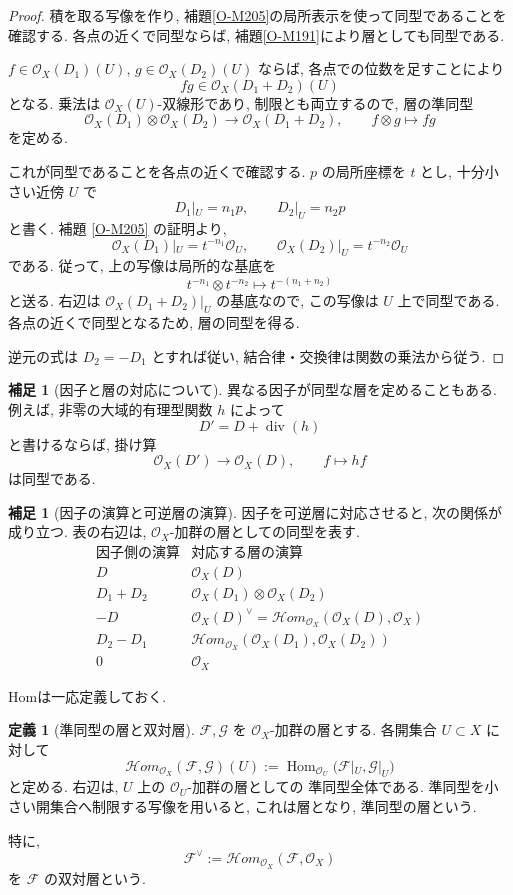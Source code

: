 \documentclass[dvipdfmx,a4paper,11pt]{article} %
\theoremstyle{definition}
\numberwithin{equation}{section}
\newtheorem{dfn}[thm]{定義}
\newtheorem{rem}[thm]{補足}
\begin{document}
\begin{proof}
積を取る写像を作り, 補題\ref{O-M205}の局所表示を使って同型であることを確認する. 各点の近くで同型ならば, 補題\ref{O-M191}により層としても同型である.

$f\in\mathcal O_X(D_1)(U)$, 
$g\in\mathcal O_X(D_2)(U)$ ならば, 
各点での位数を足すことにより
\[
fg\in\mathcal O_X(D_1+D_2)(U)
\]
となる.
乗法は $\mathcal O_X(U)$-双線形であり, 制限とも両立するので, 
層の準同型
\[
\mathcal O_X(D_1)\otimes\mathcal O_X(D_2)
\longrightarrow\mathcal O_X(D_1+D_2),
\qquad f\otimes g\longmapsto fg
\]
を定める.

これが同型であることを各点の近くで確認する.
$p$ の局所座標を $t$ とし, 十分小さい近傍 $U$ で
\[
D_1|_U=n_1p,\qquad D_2|_U=n_2p
\]
と書く.
補題 \ref{O-M205} の証明より, 
\[
\mathcal O_X(D_1)|_U=t^{-n_1}\mathcal O_U,\qquad
\mathcal O_X(D_2)|_U=t^{-n_2}\mathcal O_U
\]
である.
従って, 上の写像は局所的な基底を
\[
t^{-n_1}\otimes t^{-n_2}
\longmapsto t^{-(n_1+n_2)}
\]
と送る.
右辺は $\mathcal O_X(D_1+D_2)|_U$ の基底なので, 
この写像は $U$ 上で同型である.
各点の近くで同型となるため, 層の同型を得る.

逆元の式は $D_2=-D_1$ とすれば従い, 結合律・交換律は関数の乗法から従う.
\end{proof}

\begin{rem}[因子と層の対応について]
異なる因子が同型な層を定めることもある.
例えば, 非零の大域的有理型関数 $h$ によって
\[
D'=D+\operatorname{div}(h)
\]
と書けるならば, 掛け算
\[
\mathcal O_X(D')\longrightarrow\mathcal O_X(D),
\qquad f\longmapsto hf
\]
は同型である.
\end{rem}


\begin{rem}[因子の演算と可逆層の演算]
因子を可逆層に対応させると, 次の関係が成り立つ.
表の右辺は, $\mathcal O_X$-加群の層としての同型を表す.
\[
\begin{array}{c|c}
\text{因子側の演算} & \text{対応する層の演算}\\ \hline
D & \mathcal O_X(D)\\[2pt]
D_1+D_2
& \mathcal O_X(D_1)\otimes\mathcal O_X(D_2)\\[2pt]
-D
& \mathcal O_X(D)^\vee
 =\mathcal Hom_{\mathcal O_X}(\mathcal O_X(D),\mathcal O_X)\\[2pt]
D_2-D_1
& \mathcal Hom_{\mathcal O_X}
  (\mathcal O_X(D_1),\mathcal O_X(D_2))\\[2pt]
0 & \mathcal O_X
\end{array}
\]

Homは一応定義しておく. 
\begin{dfn}[準同型の層と双対層]
$\mathcal F,\mathcal G$ を $\mathcal O_X$-加群の層とする.
各開集合 $U\subset X$ に対して
\[
\mathcal Hom_{\mathcal O_X}(\mathcal F,\mathcal G)(U)
:=
\operatorname{Hom}_{\mathcal O_U}
\bigl(\mathcal F|_U,\mathcal G|_U\bigr)
\]
と定める.
右辺は, $U$ 上の $\mathcal O_U$-加群の層としての
準同型全体である.
準同型を小さい開集合へ制限する写像を用いると, 
これは層となり, 準同型の層という.

特に, 
\[
\mathcal F^\vee
:=\mathcal Hom_{\mathcal O_X}(\mathcal F,\mathcal O_X)
\]
を $\mathcal F$ の双対層という.
\end{dfn}
\end{rem}
\end{document}
